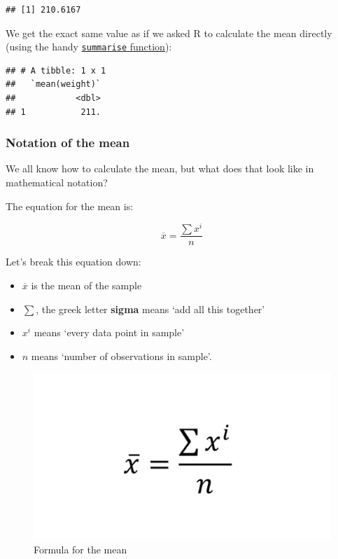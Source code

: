 \documentclass[
]{book}
\newenvironment{Shaded}{\begin{snugshade}}{\end{snugshade}}
\newcommand{\KeywordTok}[1]{\textcolor[rgb]{0.13,0.29,0.53}{\textbf{#1}}}
\newcommand{\NormalTok}[1]{#1}
\newcommand{\OperatorTok}[1]{\textcolor[rgb]{0.81,0.36,0.00}{\textbf{#1}}}
\newcommand{\StringTok}[1]{\textcolor[rgb]{0.31,0.60,0.02}{#1}}
\begin{document}
\begin{verbatim}
## [1] 210.6167
\end{verbatim}

We get the exact same value as if we asked R to calculate the mean directly (using the handy \protect\hyperlink{tidy_summ}{\texttt{summarise} function}):

\begin{Shaded}
\end{Shaded}

\begin{verbatim}
## # A tibble: 1 x 1
##   `mean(weight)`
##            <dbl>
## 1           211.
\end{verbatim}

\hypertarget{notation-of-the-mean}{%
\subsubsection{Notation of the mean}\label{notation-of-the-mean}}

We all know how to calculate the mean, but what does that look like in mathematical notation?

The equation for the mean is:

\[\overline{x} = \frac{\sum x^i}{n}    \]

\begin{translate}
Let's break this equation down:

\begin{itemize}
\item
  \(\overline{x}\) is the mean of the sample
\item
  \(\sum\), the greek letter \textbf{sigma} means `add all this
  together'
\item
  \(x^i\) means `every data point in sample'
\item
  \(n\) means `number of observations in sample'.
\end{itemize}
\end{translate}
\begin{figure}

{\centering \includegraphics{images/09_statbasic/notation_mean} 

}

\caption{Formula for the mean}\label{fig:unnamed-chunk-153}
\end{figure}
\end{document}
